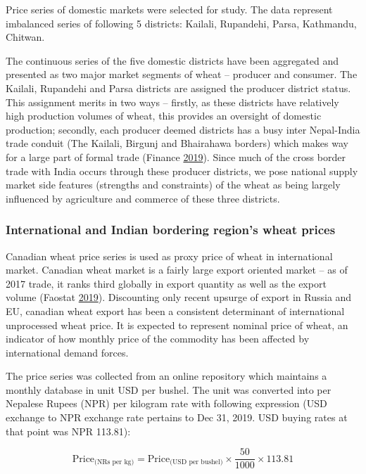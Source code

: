 \documentclass[12pt,]{article}
\begin{document}
Price series of domestic markets were selected for study. The data represent imbalanced series of following 5 districts: Kailali, Rupandehi, Parsa, Kathmandu, Chitwan.

The continuous series of the five domestic districts have been aggregated and presented as two major market segments of wheat -- producer and consumer. The Kailali, Rupandehi and Parsa districts are assigned the producer district status. This assignment merits in two ways -- firstly, as these districts have relatively high production volumes of wheat, this provides an oversight of domestic production; secondly, each producer deemed districts has a busy inter Nepal-India trade conduit (The Kailali, Birgunj and Bhairahawa borders) which makes way for a large part of formal trade (Finance \protect\hyperlink{ref-GoNMoFDoC1819}{2019}). Since much of the cross border trade with India occurs through these producer districts, we pose national supply market side features (strengths and constraints) of the wheat as being largely influenced by agriculture and commerce of these three districts.

\hypertarget{international-and-indian-bordering-regions-wheat-prices}{%
\subsubsection{International and Indian bordering region's wheat prices}\label{international-and-indian-bordering-regions-wheat-prices}}

Canadian wheat price series is used as proxy price of wheat in international market. Canadian wheat market is a fairly large export oriented market -- as of 2017 trade, it ranks third globally in export quantity as well as the export volume (Faostat \protect\hyperlink{ref-faostat2019statistical}{2019}). Discounting only recent upsurge of export in Russia and EU, canadian wheat export has been a consistent determinant of international unprocessed wheat price. It is expected to represent nominal price of wheat, an indicator of how monthly price of the commodity has been affected by international demand forces.

The price series was collected from an online repository which maintains a monthly database in unit USD per bushel. The unit was converted into per Nepalese Rupees (NPR) per kilogram rate with following expression (USD exchange to NPR exchange rate pertains to Dec 31, 2019. USD buying rates at that point was NPR 113.81):

\[
\text{Price}_{\text{(NRs per kg)}} = \text{Price}_{\textrm{(USD per bushel)}} \times \frac{50}{1000} \times 113.81
\]
\end{document}
